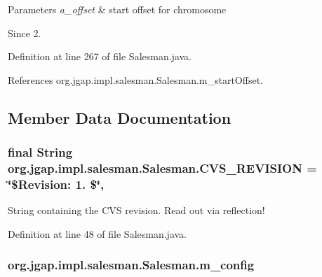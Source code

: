 \begin{DoxyParams}{Parameters}
{\em a\-\_\-offset} & start offset for chromosome\\
\hline
\end{DoxyParams}
\begin{DoxySince}{Since}
2. 
\end{DoxySince}


Definition at line 267 of file Salesman.\-java.



References org.\-jgap.\-impl.\-salesman.\-Salesman.\-m\-\_\-start\-Offset.



\subsection{Member Data Documentation}
\hypertarget{classorg_1_1jgap_1_1impl_1_1salesman_1_1_salesman_a2dfecb0dafceaa67235b2958f64770dc}{
\subsubsection[{C\-V\-S\-\_\-\-R\-E\-V\-I\-S\-I\-O\-N}]{\setlength{\rightskip}{0pt plus 5cm}final String org.\-jgap.\-impl.\-salesman.\-Salesman.\-C\-V\-S\-\_\-\-R\-E\-V\-I\-S\-I\-O\-N = \char`\"{}\$Revision\-: 1. \$\char`\"{}\hspace{0.3cm}{\ttfamily [static]}, {\ttfamily [private]}}}\label{classorg_1_1jgap_1_1impl_1_1salesman_1_1_salesman_a2dfecb0dafceaa67235b2958f64770dc}
String containing the C\-V\-S revision. Read out via reflection! 

Definition at line 48 of file Salesman.\-java.

\hypertarget{classorg_1_1jgap_1_1impl_1_1salesman_1_1_salesman_afcb5455ce482f8d5c76d0f2d882022f9}{
\subsubsection[{m\-\_\-config}]{ org.\-jgap.\-impl.\-salesman.\-Salesman.\-m\-\_\-config\hspace{0.3cm}{\ttfamily [private]}}}\label{classorg_1_1jgap_1_1impl_1_1salesman_1_1_salesman_afcb5455ce482f8d5c76d0f2d882022f9}


